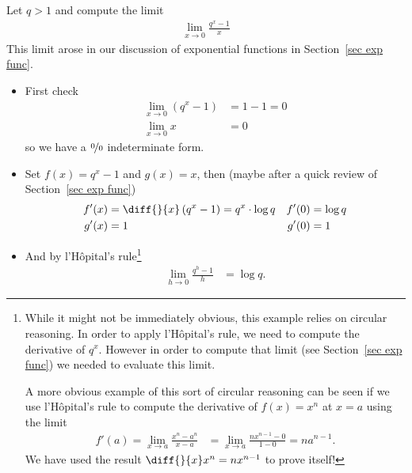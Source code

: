 \begin{eg}\label{eg_3_7_1}
 Let $q>1$ and compute the limit
\begin{align*}
  \lim_{x \to0} \frac{q^x - 1}{x}
\end{align*}
This limit arose in our discussion of exponential functions in Section~\ref{sec exp func}.

\begin{itemize}
 \item First check
\begin{align*}
  \lim_{x \to 0} (q^x-1) & = 1-1 = 0 \\
  \lim_{x \to 0} x & = 0
\end{align*}
so we have a $\nicefrac00$ indeterminate form.
\item Set $f(x)= q^x-1$ and $g(x)=x$, then (maybe after a quick review of
Section~\ref{sec exp func})
\begin{align*}
  f'(x) &= \diff{}{x}\left(q^x-1\right) = q^x \cdot \log q
  & f'(0) &= \log q\\
  g'(x) &= 1 & g'(0) &= 1
\end{align*}
\item And by l'H\^opital's rule\footnote{While it might not be immediately obvious,
this example relies on circular reasoning. In order to apply l'H\^opital's rule, we need
to compute the derivative of $q^x$. However in order to compute that limit (see
Section~\ref{sec exp func}) we needed to evaluate this limit.

A more obvious example of this sort of circular reasoning can be seen if we use
l'H\^opital's rule to compute the derivative of $f(x)=x^n$ at $x=a$ using the limit
\begin{align*}
  f'(a) = \lim_{x \to a} \frac{x^n -a^n}{x-a} &= \lim_{x \to a} \frac{n x^{n-1}-0}{1-0} =
n a^{n-1}.
\end{align*}
We have used the result $\diff{}{x} x^n = nx^{n-1}$ to prove itself!
}
\begin{align*}
  \lim_{h \to0} \frac{q^h - 1}{h} &= \log q.
\end{align*}
\end{itemize}
\end{eg}




